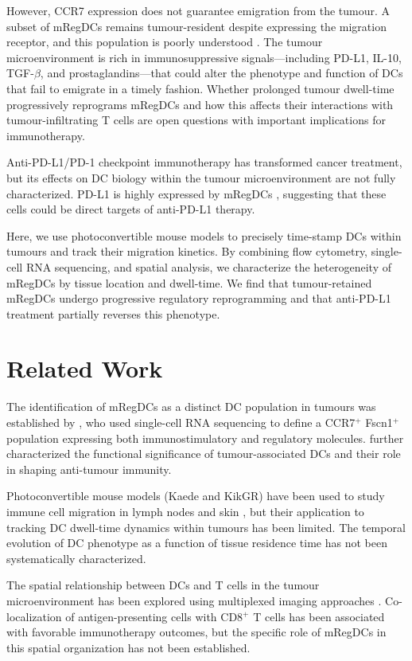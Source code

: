 \documentclass[11pt]{article}
\begin{document}
However, CCR7 expression does not guarantee emigration from the tumour. A subset of mRegDCs remains tumour-resident despite expressing the migration receptor, and this population is poorly understood \citep{maier2020ctimp}. The tumour microenvironment is rich in immunosuppressive signals---including PD-L1, IL-10, TGF-$\beta$, and prostaglandins---that could alter the phenotype and function of DCs that fail to emigrate in a timely fashion. Whether prolonged tumour dwell-time progressively reprograms mRegDCs and how this affects their interactions with tumour-infiltrating T cells are open questions with important implications for immunotherapy.

Anti-PD-L1/PD-1 checkpoint immunotherapy has transformed cancer treatment, but its effects on DC biology within the tumour microenvironment are not fully characterized. PD-L1 is highly expressed by mRegDCs \citep{maier2020ctimp}, suggesting that these cells could be direct targets of anti-PD-L1 therapy.

Here, we use photoconvertible mouse models to precisely time-stamp DCs within tumours and track their migration kinetics. By combining flow cytometry, single-cell RNA sequencing, and spatial analysis, we characterize the heterogeneity of mRegDCs by tissue location and dwell-time. We find that tumour-retained mRegDCs undergo progressive regulatory reprogramming and that anti-PD-L1 treatment partially reverses this phenotype.

\section{Related Work}

The identification of mRegDCs as a distinct DC population in tumours was established by \citet{maier2020ctimp}, who used single-cell RNA sequencing to define a CCR7$^+$ Fscn1$^+$ population expressing both immunostimulatory and regulatory molecules. \citet{gerhard2021tumor} further characterized the functional significance of tumour-associated DCs and their role in shaping anti-tumour immunity.

Photoconvertible mouse models (Kaede and KikGR) have been used to study immune cell migration in lymph nodes and skin \citep{tomura2008monitoring}, but their application to tracking DC dwell-time dynamics within tumours has been limited. The temporal evolution of DC phenotype as a function of tissue residence time has not been systematically characterized.

The spatial relationship between DCs and T cells in the tumour microenvironment has been explored using multiplexed imaging approaches \citep{schurch2020coordinated}. Co-localization of antigen-presenting cells with CD8$^+$ T cells has been associated with favorable immunotherapy outcomes, but the specific role of mRegDCs in this spatial organization has not been established.
\end{document}
